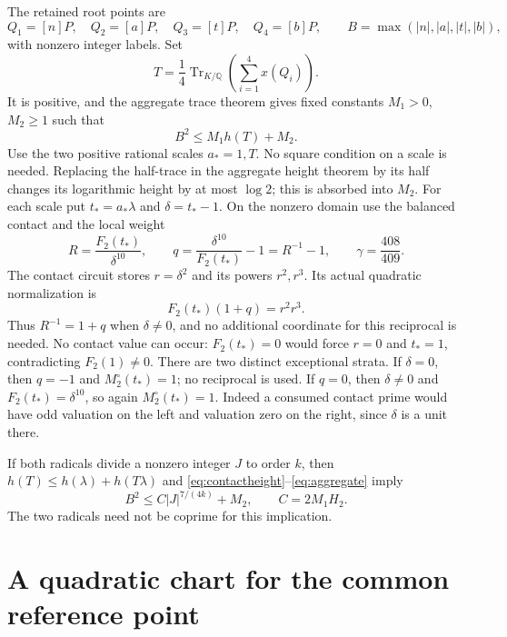 \documentclass[11pt,a4paper]{article}
\newcommand{\Q}{\mathbb Q}\newcommand{\Z}{\mathbb Z}\newcommand{\HH}{\mathcal H}
\DeclareMathOperator{\Tr}{Tr}\DeclareMathOperator{\Nm}{Nm}
\begin{document}
The retained root points are
\[
 Q_1=[n]P,\quad Q_2=[a]P,\quad Q_3=[t]P,\quad Q_4=[b]P,
 \qquad B=\max(|n|,|a|,|t|,|b|),
\]
with nonzero integer labels. Set
\[
 T=\frac14\Tr_{K/\Q}\left(\sum_{i=1}^4x(Q_i)\right).
\]
It is positive, and the aggregate trace theorem gives fixed constants
$M_1>0$, $M_2\ge1$ such that
\begin{equation}\label{eq:aggregate}
                         B^2\le M_1h(T)+M_2.
\end{equation}
Use the two positive rational scales $a_*=1,T$. No square condition
on a scale is needed. Replacing the half-trace in the aggregate
height theorem by its half changes its logarithmic height by at
most $\log2$; this is absorbed into $M_2$.
For each scale put $t_*=a_*\lambda$ and $\delta=t_*-1$.
On the nonzero domain use the balanced contact and the local weight
\begin{equation}\label{eq:detector}
 R=\frac{F_2(t_*)}{\delta^{10}},\qquad
 q=\frac{\delta^{10}}{F_2(t_*)}-1=R^{-1}-1,
 \qquad \gamma=\frac{408}{409}.
\end{equation}
The contact circuit stores $r=\delta^2$ and its powers $r^2,r^3$.
Its actual quadratic normalization is
\begin{equation}\label{eq:clearing}
                         F_2(t_*)(1+q)=r^2r^3.
\end{equation}
Thus $R^{-1}=1+q$ when $\delta\ne0$, and no additional coordinate
for this reciprocal is needed. No contact value can occur:
$F_2(t_*)=0$ would force $r=0$ and $t_*=1$, contradicting $F_2(1)\ne0$.
There are two distinct exceptional strata. If $\delta=0$, then $q=-1$
and $M_2^\circ(t_*)=1$; no reciprocal is used. If $q=0$, then $\delta\ne0$
and $F_2(t_*)=\delta^{10}$, so again $M_2^\circ(t_*)=1$. Indeed a consumed
contact prime would have odd valuation on the left and valuation zero
on the right, since $\delta$ is a unit there.

If both radicals divide a nonzero integer $J$ to order $k$, then
$h(T)\le h(\lambda)+h(T\lambda)$ and
\eqref{eq:contactheight}--\eqref{eq:aggregate} imply
\begin{equation}\label{eq:heighttransfer}
 B^2\le C|J|^{7/(4k)}+M_2,\qquad C=2M_1H_2.
\end{equation}
The two radicals need not be coprime for this implication.

\section{A quadratic chart for the common reference point}
\end{document}

